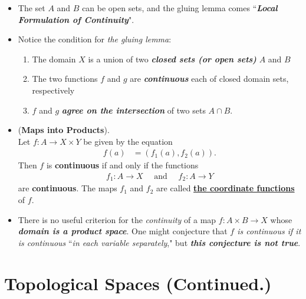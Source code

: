 \documentclass[11pt]{article}
\begin{document}
\begin{itemize}
\item \begin{remark}
The set $A$ and $B$ can be open sets, and the gluing lemma comes ``\emph{\textbf{Local Formulation of Continuity}}".
\end{remark}

\item \begin{remark}
Notice the condition for \emph{the gluing lemma}:
\begin{enumerate}
\item The domain $X$ is a union of two \emph{\textbf{closed sets (or open sets)}} $A$ and $B$
\item The two functions $f$ and $g$ are \emph{\textbf{continuous}} each of closed domain sets, respectively
\item $f$ and $g$ \emph{\textbf{agree on the intersection}} of two sets $A \cap B$.
\end{enumerate}
\end{remark}

\item \begin{theorem} (\textbf{Maps into Products}). \citep{munkres2000topology}\\
Let $f : A \rightarrow X \times Y$ be given by the equation
\begin{align*}
f(a)  &= (f_1(a), f_2(a)).
\end{align*} Then $f$ is \textbf{continuous} if and only if the functions
\begin{align*}
f_1: A \rightarrow X\quad \text{ and }\quad f_2: A \rightarrow Y
\end{align*} 
are \textbf{continuous}. The maps $f_1$ and $f_2$ are called \underline{\textbf{the coordinate functions}} of $f$.
\end{theorem}

\item \begin{remark}
There is no useful criterion for the \emph{continuity} of a map $f : A \times B \rightarrow X$ whose \emph{\textbf{domain is a product space}}. One might conjecture that \emph{$f$ is continuous if it is continuous }``\emph{in each variable separately}," but \emph{\textbf{this conjecture is not true}}.
\end{remark}
\end{itemize}

\section{Topological Spaces (Continued.)}
\end{document}
